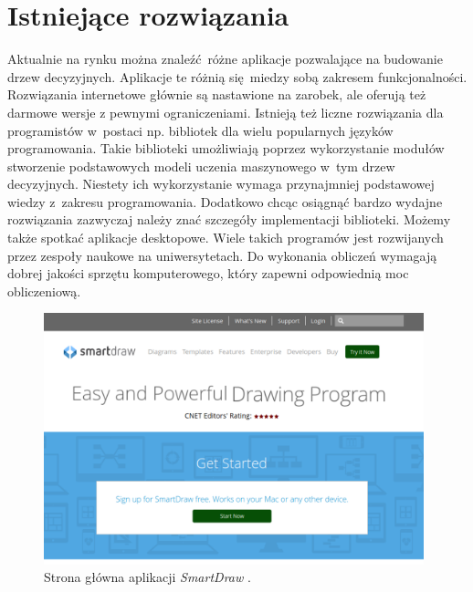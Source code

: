 \section{Istniejące rozwiązania}
Aktualnie na rynku można znaleźć różne aplikacje pozwalające na budowanie drzew decyzyjnych. Aplikacje te różnią się miedzy sobą zakresem funkcjonalności. Rozwiązania internetowe głównie są nastawione na zarobek, ale oferują też darmowe wersje z pewnymi ograniczeniami. Istnieją też liczne rozwiązania dla programistów w~postaci np. bibliotek dla wielu popularnych języków programowania. Takie biblioteki umożliwiają poprzez wykorzystanie modułów stworzenie podstawowych modeli uczenia maszynowego w~tym drzew decyzyjnych. Niestety ich wykorzystanie wymaga przynajmniej podstawowej wiedzy z~zakresu programowania. Dodatkowo chcąc osiągnąć bardzo wydajne rozwiązania zazwyczaj należy znać szczegóły implementacji biblioteki. Możemy także spotkać aplikacje desktopowe. Wiele takich programów jest rozwijanych przez zespoły naukowe na uniwersytetach. Do wykonania obliczeń wymagają dobrej jakości sprzętu komputerowego, który zapewni odpowiednią moc obliczeniową. 

\begin{figure}[htb]
	\centering
	\includegraphics[width=11cm]{grafika/smartdraw.eps}
	\caption{Strona główna aplikacji \textit{SmartDraw} \cite{misc_smartdraw}.}
	\label{rys21_smartdraw}
\end{figure}

